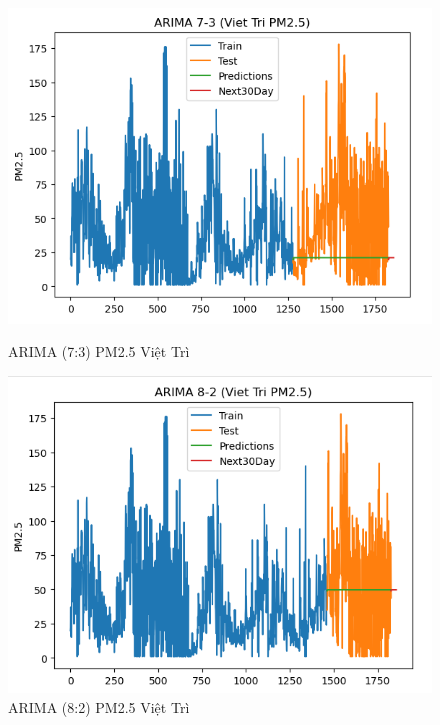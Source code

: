\begin{figure}[h]
\begin{minipage}[b]{0.45\linewidth}
        \includegraphics[width=\linewidth]{img/ARIMA_7_3_VT.png}
        \caption{\scriptsize ARIMA (7:3) PM2.5  Việt Trì}
        \label{fig1}
    \end{minipage}\hfill
    \begin{minipage}[b]{0.45\linewidth}
        \centering
        \includegraphics[width=\linewidth]{img/ARIMA_8_2_Vt.png}
        \caption{\scriptsize ARIMA (8:2) PM2.5 Việt Trì}
        \label{fig2}
    \end{minipage}
    \begin{minipage}[b]{0.45\linewidth}
        \centering

\end{minipage}
\end{figure}
